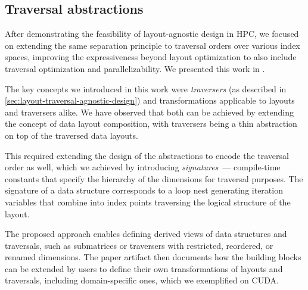 \subsection{Traversal abstractions}\label{sec:pure-cpp-approach}

After demonstrating the feasibility of layout-agnostic design in HPC, we focused on extending the same separation principle to traversal orders over various index spaces, improving the expressiveness beyond layout optimization to also include traversal optimization and parallelizability. We presented this work in .

The key concepts we introduced in this work were \emph{traversers} (as described in \cref{sec:layout-traversal-agnostic-design}) and transformations applicable to layouts and traversers alike. We have observed that both can be achieved by extending the concept of data layout composition, with traversers being a thin abstraction on top of the traversed data layouts.

This required extending the design of the abstractions to encode the traversal order as well, which we achieved by introducing \emph{signatures}~--- compile-time constants that specify the hierarchy of the dimensions for traversal purposes.
The signature of a data structure corresponds to a loop nest generating iteration variables that combine into index points traversing the logical structure of the layout.

The proposed approach enables defining derived views of data structures and traversals, such as submatrices or traversers with restricted, reordered, or renamed dimensions. The paper artifact then documents how the building blocks can be extended by users to define their own transformations of layouts and traversals, including domain-specific ones, which we exemplified on CUDA\@.

